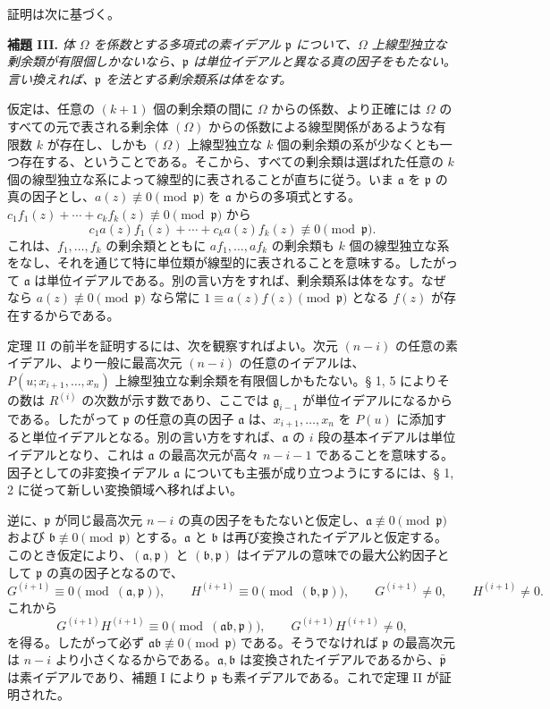 \documentclass[11pt]{article}
\providecommand{\frakp}{\mathfrak p}
\providecommand{\fraka}{\mathfrak a}
\providecommand{\frakb}{\mathfrak b}
\providecommand{\frakg}{\mathfrak g}
\providecommand{\frakp}{\mathfrak p}
\begin{document}
証明は次に基づく。

\textbf{補題 III.} \emph{体 $\Omega$ を係数とする多項式の素イデアル $\frakp$ について、$\Omega$ 上線型独立な剰余類が有限個しかないなら、$\frakp$ は単位イデアルと異なる真の因子をもたない。言い換えれば、$\frakp$ を法とする剰余類系は体をなす。}

仮定は、任意の $(k+1)$ 個の剰余類の間に $\Omega$ からの係数、より正確には $\Omega$ のすべての元で表される剰余体 $(\Omega)$ からの係数による線型関係があるような有限数 $k$ が存在し、しかも $(\Omega)$ 上線型独立な $k$ 個の剰余類の系が少なくとも一つ存在する、ということである。そこから、すべての剰余類は選ばれた任意の $k$ 個の線型独立な系によって線型的に表されることが直ちに従う。いま $\fraka$ を $\frakp$ の真の因子とし、$a(z)\not\equiv0\pmod{\frakp}$ を $\fraka$ からの多項式とする。$c_1f_1(z)+\cdots+c_kf_k(z)\not\equiv0\pmod{\frakp}$ から
\[
 c_1a(z)f_1(z)+\cdots+c_ka(z)f_k(z)\not\equiv0\pmod{\frakp}.
\]
これは、$f_1,\ldots,f_k$ の剰余類とともに $af_1,\ldots,af_k$ の剰余類も $k$ 個の線型独立な系をなし、それを通じて特に単位類が線型的に表されることを意味する。したがって $\fraka$ は単位イデアルである。別の言い方をすれば、剰余類系は体をなす。なぜなら $a(z)\not\equiv0\pmod{\frakp}$ なら常に $1\equiv a(z)f(z)\pmod{\frakp}$ となる $f(z)$ が存在するからである。

定理 II の前半を証明するには、次を観察すればよい。次元 $(n-i)$ の任意の素イデアル、より一般に最高次元 $(n-i)$ の任意のイデアルは、$P(u;x_{i+1},\ldots,x_n)$ 上線型独立な剰余類を有限個しかもたない。§ 1, 5 によりその数は $R^{(i)}$ の次数が示す数であり、ここでは $\frakg_{i-1}$ が単位イデアルになるからである。したがって $\frakp$ の任意の真の因子 $\fraka$ は、$x_{i+1},\ldots,x_n$ を $P(u)$ に添加すると単位イデアルとなる。別の言い方をすれば、$\fraka$ の $i$ 段の基本イデアルは単位イデアルとなり、これは $\fraka$ の最高次元が高々 $n-i-1$ であることを意味する。因子としての非変換イデアル $\fraka$ についても主張が成り立つようにするには、§ 1, 2 に従って新しい変換領域へ移ればよい。

逆に、$\frakp$ が同じ最高次元 $n-i$ の真の因子をもたないと仮定し、$\fraka\not\equiv0\pmod{\frakp}$ および $\frakb\not\equiv0\pmod{\frakp}$ とする。$\fraka$ と $\frakb$ は再び変換されたイデアルと仮定する。このとき仮定により、$(\fraka,\frakp)$ と $(\frakb,\frakp)$ はイデアルの意味での最大公約因子として $\frakp$ の真の因子となるので、
\[
 G^{(i+1)}\equiv0\pmod{(\fraka,\frakp)},\qquad
 H^{(i+1)}\equiv0\pmod{(\frakb,\frakp)},\qquad
 G^{(i+1)}\ne0,\qquad H^{(i+1)}\ne0.
\]
これから
\[
 G^{(i+1)}H^{(i+1)}\equiv0\pmod{(\fraka\frakb,\frakp)},\qquad
 G^{(i+1)}H^{(i+1)}\ne0,
\]
を得る。したがって必ず $\fraka\frakb\not\equiv0\pmod{\frakp}$ である。そうでなければ $\frakp$ の最高次元は $n-i$ より小さくなるからである。$\fraka,\frakb$ は変換されたイデアルであるから、$\bar{\frakp}$ は素イデアルであり、補題 I により $\frakp$ も素イデアルである。これで定理 II が証明された。
\end{document}
